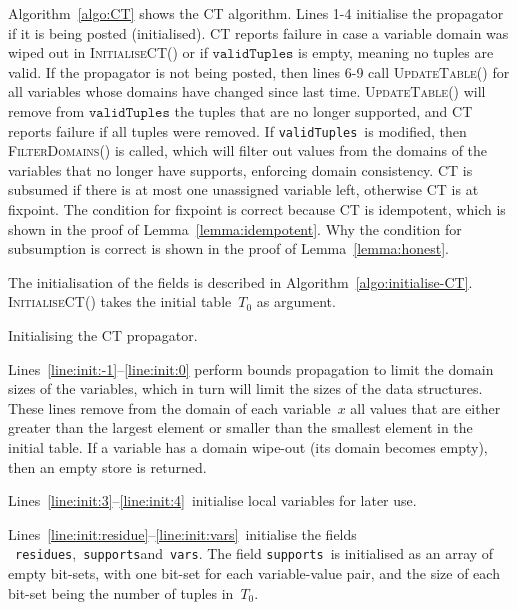 \documentclass[a4paper,11pt]{article}
\newcommand{\Algoref}[1]{Algorithm~\ref{#1}}
\newcommand{\Linesref}[2]{Lines~\ref{#1}--\ref{#2}}
\newcommand{\CurrTable}{\texttt{validTuples}}
\newcommand{\Supports}{\texttt{supports}}
\newcommand{\Residues}{\texttt{residues}}
\newcommand{\Vars}{\texttt{vars}}
\def\UpdateTable{\textsc{UpdateTable}}
\def\FilterDomains{\textsc{FilterDomains}}
\def\InitialiseCT{\textsc{InitialiseCT}}
\newcommand{\localvar}[1]{\mathit{#1}}
\numberwithin{equation}{section}
\begin{document}
\Algoref{algo:CT} shows the CT algorithm. Lines 1-4 initialise the propagator
if it is being posted (initialised). CT reports failure in case a variable domain was
wiped out in \InitialiseCT() or if $\CurrTable$ is empty, meaning no tuples are valid.
If the propagator is not being posted, then
lines 6-9 call \UpdateTable() for all variables whose domains have changed
since last time. \UpdateTable() will remove from $\CurrTable$ the tuples that
are no longer supported, and CT reports failure if all tuples were removed.
If \CurrTable~is modified, then \FilterDomains() is
called, which will filter out values from the domains of the variables that
no longer have supports, enforcing domain consistency.
CT is subsumed if there is at most one unassigned variable
left, otherwise CT is at fixpoint.
The condition for fixpoint is correct because CT is idempotent,
which is shown in the proof of Lemma~\ref{lemma:idempotent}.
Why the condition for subsumption is correct is shown in the proof of 
Lemma~\ref{lemma:honest}.



The initialisation of the fields is described in
\Algoref{algo:initialise-CT}. \InitialiseCT() takes the 
initial table~$\localvar{T_0}$ as argument.

\begin{algorithm}[t]
  \begin{algorithmic}[1]  %
    
  \end{algorithmic}
  \caption{Initialising the CT propagator.}
  \label{algo:initialise-CT}
\end{algorithm}

\Linesref{line:init:-1}{line:init:0} perform bounds
  propagation to limit the domain sizes of the variables,
  which in turn will limit the sizes of the data structures.
  These lines remove from the domain of each variable~$x$ all
  values that are either greater 
  than the largest element or smaller than the smallest element in the
  initial table. If a variable has a domain wipe-out
  (its domain becomes empty), then an empty store is returned.

\Linesref{line:init:3}{line:init:4}~initialise local variables for later use.

\Linesref{line:init:residue}{line:init:vars}~initialise the fields
~\Residues,~\Supports and~\Vars.
The field \Supports~is initialised as an array of empty bit-sets,
with one bit-set for each
variable-value pair, and the size of each
bit-set being the number of tuples in~$T_0$.
\end{document}
